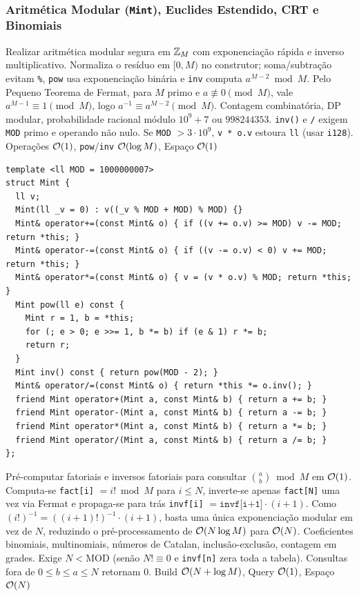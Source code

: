 \subsubsection{Aritmética Modular (\texttt{Mint}), Euclides Estendido, CRT e Binomiais}
\algobox
  {Realizar aritmética modular segura em $\mathbb{Z}_M$ com exponenciação rápida e inverso multiplicativo.}
  {Normaliza o resíduo em $[0, M)$ no construtor; soma/subtração evitam \texttt{\%}, \texttt{pow} usa exponenciação binária e \texttt{inv} computa $a^{M-2} \bmod M$.}
  {Pelo Pequeno Teorema de Fermat, para $M$ primo e $a \not\equiv 0 \pmod M$, vale $a^{M-1} \equiv 1 \pmod M$, logo $a^{-1} \equiv a^{M-2} \pmod M$.}
  {Contagem combinatória, DP modular, probabilidade racional módulo $10^9+7$ ou $998244353$.}
  {\texttt{inv()} e \texttt{/} exigem \texttt{MOD} primo e operando não nulo. Se \texttt{MOD} $> 3 \cdot 10^9$, \texttt{v * o.v} estoura \texttt{ll} (usar \texttt{i128}).}
  {Operações $\mathcal{O}(1)$, \texttt{pow}/\texttt{inv} $\mathcal{O}(\log M)$, Espaço $\mathcal{O}(1)$}

\begin{lstlisting}
template <ll MOD = 1000000007>
struct Mint {
  ll v;
  Mint(ll _v = 0) : v((_v % MOD + MOD) % MOD) {}
  Mint& operator+=(const Mint& o) { if ((v += o.v) >= MOD) v -= MOD; return *this; }
  Mint& operator-=(const Mint& o) { if ((v -= o.v) < 0) v += MOD; return *this; }
  Mint& operator*=(const Mint& o) { v = (v * o.v) % MOD; return *this; }
  Mint pow(ll e) const {
    Mint r = 1, b = *this;
    for (; e > 0; e >>= 1, b *= b) if (e & 1) r *= b;
    return r;
  }
  Mint inv() const { return pow(MOD - 2); }
  Mint& operator/=(const Mint& o) { return *this *= o.inv(); }
  friend Mint operator+(Mint a, const Mint& b) { return a += b; }
  friend Mint operator-(Mint a, const Mint& b) { return a -= b; }
  friend Mint operator*(Mint a, const Mint& b) { return a *= b; }
  friend Mint operator/(Mint a, const Mint& b) { return a /= b; }
};
\end{lstlisting}

\algobox
  {Pré-computar fatoriais e inversos fatoriais para consultar $\binom{a}{b} \bmod M$ em $\mathcal{O}(1)$.}
  {Computa-se \texttt{fact[i]} $= i! \bmod M$ para $i \le N$, inverte-se apenas \texttt{fact[N]} uma vez via Fermat e propaga-se para trás \texttt{invf[i]} $= \texttt{invf[i+1]} \cdot (i + 1)$.}
  {Como $(i!)^{-1} = ((i+1)!)^{-1} \cdot (i+1)$, basta uma única exponenciação modular em vez de $N$, reduzindo o pré-processamento de $\mathcal{O}(N \log M)$ para $\mathcal{O}(N)$.}
  {Coeficientes binomiais, multinomiais, números de Catalan, inclusão-exclusão, contagem em grades.}
  {Exige $N < \text{MOD}$ (senão $N! \equiv 0$ e \texttt{invf[n]} zera toda a tabela). Consultas fora de $0 \le b \le a \le N$ retornam $0$.}
  {Build $\mathcal{O}(N + \log M)$, Query $\mathcal{O}(1)$, Espaço $\mathcal{O}(N)$}

